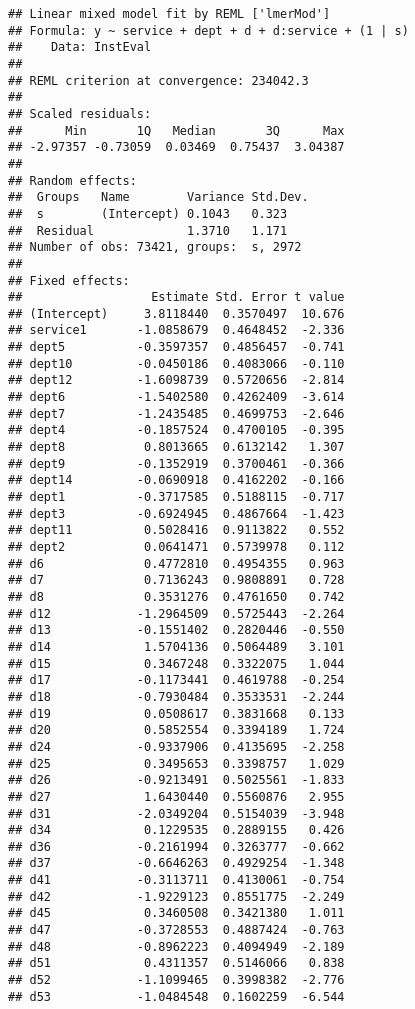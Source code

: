 \documentclass[
]{article}
\begin{document}
\begin{verbatim}
## Linear mixed model fit by REML ['lmerMod']
## Formula: y ~ service + dept + d + d:service + (1 | s)
##    Data: InstEval
## 
## REML criterion at convergence: 234042.3
## 
## Scaled residuals: 
##      Min       1Q   Median       3Q      Max 
## -2.97357 -0.73059  0.03469  0.75437  3.04387 
## 
## Random effects:
##  Groups   Name        Variance Std.Dev.
##  s        (Intercept) 0.1043   0.323   
##  Residual             1.3710   1.171   
## Number of obs: 73421, groups:  s, 2972
## 
## Fixed effects:
##                  Estimate Std. Error t value
## (Intercept)     3.8118440  0.3570497  10.676
## service1       -1.0858679  0.4648452  -2.336
## dept5          -0.3597357  0.4856457  -0.741
## dept10         -0.0450186  0.4083066  -0.110
## dept12         -1.6098739  0.5720656  -2.814
## dept6          -1.5402580  0.4262409  -3.614
## dept7          -1.2435485  0.4699753  -2.646
## dept4          -0.1857524  0.4700105  -0.395
## dept8           0.8013665  0.6132142   1.307
## dept9          -0.1352919  0.3700461  -0.366
## dept14         -0.0690918  0.4162202  -0.166
## dept1          -0.3717585  0.5188115  -0.717
## dept3          -0.6924945  0.4867664  -1.423
## dept11          0.5028416  0.9113822   0.552
## dept2           0.0641471  0.5739978   0.112
## d6              0.4772810  0.4954355   0.963
## d7              0.7136243  0.9808891   0.728
## d8              0.3531276  0.4761650   0.742
## d12            -1.2964509  0.5725443  -2.264
## d13            -0.1551402  0.2820446  -0.550
## d14             1.5704136  0.5064489   3.101
## d15             0.3467248  0.3322075   1.044
## d17            -0.1173441  0.4619788  -0.254
## d18            -0.7930484  0.3533531  -2.244
## d19             0.0508617  0.3831668   0.133
## d20             0.5852554  0.3394189   1.724
## d24            -0.9337906  0.4135695  -2.258
## d25             0.3495653  0.3398757   1.029
## d26            -0.9213491  0.5025561  -1.833
## d27             1.6430440  0.5560876   2.955
## d31            -2.0349204  0.5154039  -3.948
## d34             0.1229535  0.2889155   0.426
## d36            -0.2161994  0.3263777  -0.662
## d37            -0.6646263  0.4929254  -1.348
## d41            -0.3113711  0.4130061  -0.754
## d42            -1.9229123  0.8551775  -2.249
## d45             0.3460508  0.3421380   1.011
## d47            -0.3728553  0.4887424  -0.763
## d48            -0.8962223  0.4094949  -2.189
## d51             0.4311357  0.5146066   0.838
## d52            -1.1099465  0.3998382  -2.776
## d53            -1.0484548  0.1602259  -6.544

\end{verbatim}
\end{document}
